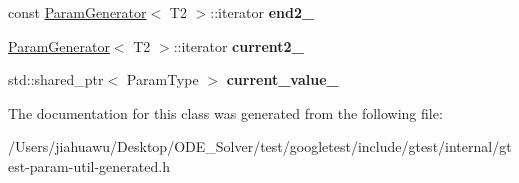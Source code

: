 \begin{DoxyCompactItemize}
const \mbox{\hyperlink{classtesting_1_1internal_1_1_param_generator}{Param\+Generator}}$<$ T2 $>$\+::iterator {\bfseries end2\+\_\+}
\item 
\mbox{\label{classtesting_1_1internal_1_1_cartesian_product_generator2_1_1_iterator_a3832af338d3433abdd84805ded9017e0}} 
\mbox{\hyperlink{classtesting_1_1internal_1_1_param_generator}{Param\+Generator}}$<$ T2 $>$\+::iterator {\bfseries current2\+\_\+}
\item 
\mbox{\label{classtesting_1_1internal_1_1_cartesian_product_generator2_1_1_iterator_a52fe871f3f904759d3f1432e2c7bd339}} 
std\+::shared\+\_\+ptr$<$ Param\+Type $>$ {\bfseries current\+\_\+value\+\_\+}
\end{DoxyCompactItemize}


The documentation for this class was generated from the following file\+:\begin{DoxyCompactItemize}
\item 
/\+Users/jiahuawu/\+Desktop/\+O\+D\+E\+\_\+\+Solver/test/googletest/include/gtest/internal/gtest-\/param-\/util-\/generated.\+h\end{DoxyCompactItemize}
